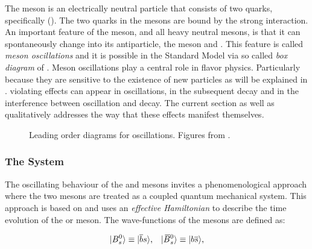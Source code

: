 The \Bs meson is an electrically neutral particle that consists of two quarks, specifically (\bquarkbar\squark).
The two quarks in the mesons are bound by the strong interaction. An important feature of
the \Bs meson, and all heavy neutral mesons, is that it can spontaneously change into its antiparticle,
the \Bsb meson and \viceversa. This feature is called {\it meson oscillations} and it is possible
in the Standard Model via so called {\it box diagram} of .
Meson oscillations play a central role in flavor physics. Particularly because they are sensitive to the
existence of new particles as will be explained in . \CP violating effects can
appear in \BBbarSyst oscillations, in the subsequent decay and in the interference between oscillation
and decay. The current section as well as  qualitatively addresses the way that
these effects manifest themselves.

\begin{figure}[!h]
  \centering
  \begin{subfigure}{0.5\textwidth}
    \centering
    \raggedright
    \scalebox{0.9}{\sffamily }
    \caption{}
    \label{bs_box_1}
  \end{subfigure}%
  \hfill%
  \begin{subfigure}{0.5\textwidth}
    \centering
    \raggedleft
    \scalebox{0.9}{\sffamily }
    \caption{}
    \label{bs_box_2}
  \end{subfigure}
  \caption{Leading order diagrams for \BBbarSyst oscillations. Figures from \cite{jeroenThesis}.}
  \label{bs_box}
\end{figure}

\subsubsection{The \BBbarSyst System}
\label{the_bbar_system}

The oscillating behaviour of the \Bs and \Bsb mesons invites a phenomenological approach
where the two mesons are treated as a coupled quantum mechanical system. This approach
is based on \cite{Weisskopf:1930au,Weisskopf:1930ps} and uses an {\it effective Hamiltonian}
\cite{eff-hamiltonian-bs-syst,DeBruyn-thesis} to describe the time evolution of the \Bs or \Bsb meson.
The wave-functions of the mesons are defined as:

\begin{equation}
  \centering
  \ket{\Bs}  \equiv  \ket{\bquarkbar\squark}, \;\;\; \ket{\Bsb} \equiv  \ket{\bquark\squarkbar},
  \label{bs_wavefunctions}
\end{equation}

